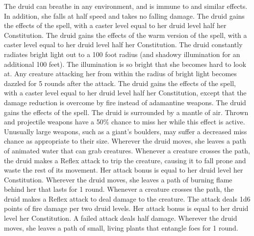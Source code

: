  The druid can breathe in any environment, and is immune to 
and similar effects.
In addition, she falls at half speed and takes no falling damage.
 The druid gains the effects of the 
spell, with a caster level equal to her druid level \add half her Constitution.
 The druid gains the effects of the warm version of the 
spell, with a caster level equal to her druid level \add half her Constitution.
The druid constantly radiates bright light out to a 100 foot radius (and shadowy illumination for an additional 100 feet).
The illumination is so bright that she becomes hard to look at.
Any creature attacking her from within the radius of bright light becomes dazzled for 5 rounds after the attack.
 The druid gains the effects of the 
spell, with a caster level equal to her druid level \add half her Constitution, except that the damage reduction is overcome by fire instead of adamantine weapons.
 The druid gains the effects of the 
spell.
 The druid is surrounded by a mantle of air.
Thrown and projectile weapons have a 50\% chance to miss her while this effect is active.
Unusually large weapons, such as a giant's boulders, may suffer a decreased miss chance as appropriate to their size.
 Wherever the druid moves, she leaves a path of animated water that can grab creatures.
Whenever a creature crosses the path, the druid makes a Reflex attack to trip the creature, causing it to fall prone and waste the rest of its movement.
Her attack bonus is equal to her druid level \add her Constitution.
Wherever the druid moves, she leaves a path of burning flame behind her that lasts for 1 round.
Whenever a creature crosses the path, the druid makes a Reflex attack to deal damage to the creature.
The attack deals 1d6 points of fire damage per two druid levels.
Her attack bonus is equal to her druid level \add her Constitution.
A failed attack deals half damage.
Wherever the druid moves, she leaves a path of small, living plants that entangle foes for 1 round.
